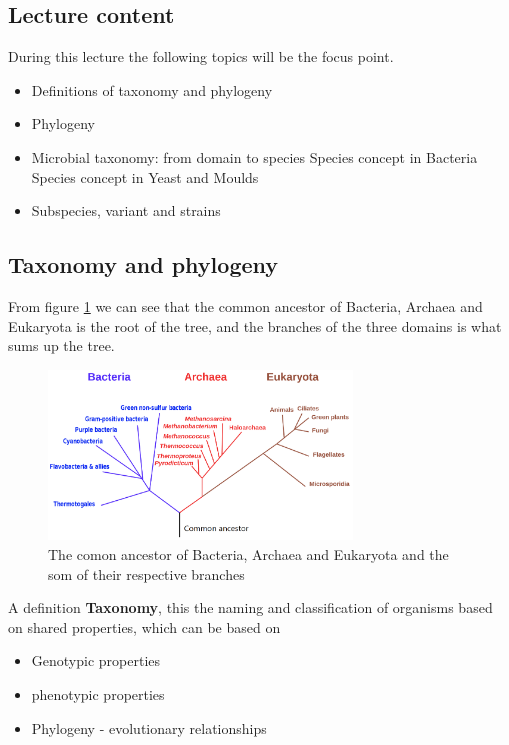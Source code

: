 \subsection{Lecture content}

During this lecture the following topics will be the focus point.

\begin{highlight}
    \begin{itemize}
        \item Definitions of taxonomy and phylogeny
        \item Phylogeny
        \item Microbial taxonomy: from domain to species
        \subitem Species concept in Bacteria
        \subitem Species concept in Yeast and Moulds
        \item Subspecies, variant and strains
    \end{itemize}
\end{highlight}

\subsection{Taxonomy and phylogeny}
From figure \ref*{fig:TaxDiff} we can see that the common ancestor of Bacteria, Archaea and Eukaryota is the root of the tree, and the branches of the three domains is what sums up the tree. 
\begin{figure}[h]
    \centering
    \includegraphics[width=0.72\textwidth]{Figures/TaxonomyDiff.png}
    \caption{The comon ancestor of Bacteria, Archaea and Eukaryota and the som of their respective branches}    \label{fig:TaxDiff}
\end{figure}

A definition \textbf{Taxonomy}, this the naming and classification of organisms based on shared properties, which can be based on

\begin{highlight}
    \begin{itemize}
        \item Genotypic properties
        \item phenotypic properties
        \item Phylogeny - evolutionary relationships
    \end{itemize}
\end{highlight}

